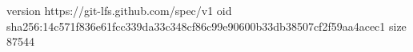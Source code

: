 version https://git-lfs.github.com/spec/v1
oid sha256:14c571f836e61fcc339da33c348cf86c99e90600b33db38507cf2f59aa4acec1
size 87544
